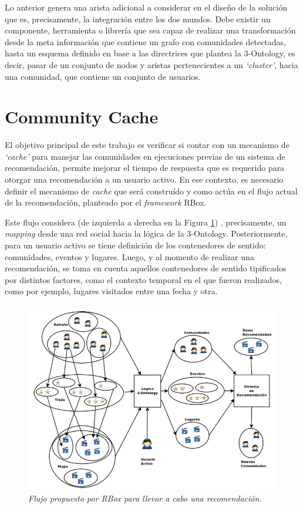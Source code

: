 Lo anterior genera una arista adicional a considerar en el diseño de la solución que es, precisamente, la integración entre los dos mundos. Debe existir un componente, herramienta o librería que sea capaz de realizar una transformación desde la meta información que contiene un grafo con comunidades detectadas, hasta un esquema definido en base a las directrices que plantea la 3-Ontology, es decir, pasar de un conjunto de nodos y aristas pertenecientes a un \textit{‘cluster’}, hacia una comunidad, que contiene un conjunto de usuarios.

\section{Community Cache}

El objetivo principal de este trabajo es verificar si contar con un mecanismo de \textit{‘\textit{cache}’} para manejar las comunidades en ejecuciones previas de un sistema de recomendación, permite mejorar el tiempo de respuesta que es requerido para otorgar una recomendación a un usuario activo. En ese contexto, es necesario definir el mecanismo de \textit{cache} que será construído y como actúa en el flujo actual de la recomendación, planteado por el \textit{framework} RBox.

Este flujo considera (de izquierda a derecha en la Figura \ref{fig:vis-im3}) , precisamente, un \textit{mapping} desde una red social hacia la lógica de la 3-Ontology. Posteriormente, para un usuario activo se tiene definición de los contenedores de sentido: comunidades, eventos y lugares. Luego, y al momento de realizar una recomendación, se toma en cuenta aquellos contenedores de sentido tipificados por distintos factores, como el contexto temporal en el que fueron realizados, como por ejemplo, lugares visitados entre una fecha y otra.

\begin{figure}
  \centering
  \includegraphics[scale=.5]{images/Figura7-3}
  \caption{\em Flujo propuesto por RBox para llevar a cabo una recomendación.}
  \label{fig:vis-im3}
\end{figure}


